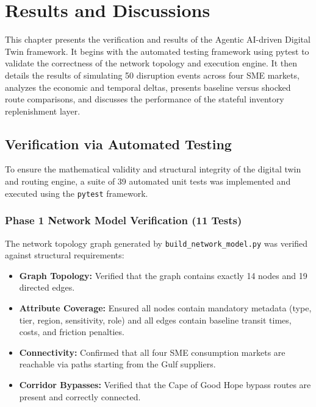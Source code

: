 \chapter{Results and Discussions}

This chapter presents the verification and results of the Agentic AI-driven Digital Twin framework. It begins with the automated testing framework using pytest to validate the correctness of the network topology and execution engine. It then details the results of simulating 50 disruption events across four SME markets, analyzes the economic and temporal deltas, presents baseline versus shocked route comparisons, and discusses the performance of the stateful inventory replenishment layer.

\section{Verification via Automated Testing}
To ensure the mathematical validity and structural integrity of the digital twin and routing engine, a suite of 39 automated unit tests was implemented and executed using the \texttt{pytest} framework.

\subsection{Phase 1 Network Model Verification (11 Tests)}
The network topology graph generated by \texttt{build\_network_model.py} was verified against structural requirements:
\begin{itemize}
    \item \textbf{Graph Topology:} Verified that the graph contains exactly 14 nodes and 19 directed edges.
    \item \textbf{Attribute Coverage:} Ensured all nodes contain mandatory metadata (type, tier, region, sensitivity, role) and all edges contain baseline transit times, costs, and friction penalties.
    \item \textbf{Connectivity:} Confirmed that all four SME consumption markets are reachable via paths starting from the Gulf suppliers.
    \item \textbf{Corridor Bypasses:} Verified that the Cape of Good Hope bypass routes are present and correctly connected.
\end{itemize}

